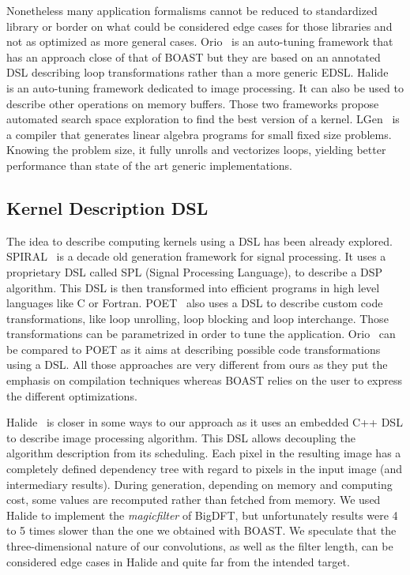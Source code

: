 \documentclass{IEEEtran}
\begin{document}
Nonetheless many application formalisms cannot be reduced to standardized
library or border on what could be considered edge cases for those libraries and
not as optimized as more general cases. Orio~\cite{Hart2009:Orio} is an
auto-tuning framework that has an approach close of that of BOAST but they are
based on an annotated DSL describing loop transformations rather than a more
generic EDSL. Halide~\cite{ragan2013halide} is an auto-tuning framework
dedicated to image processing. It can also be used to describe other
operations on memory buffers. Those two frameworks propose automated search
space exploration to find the best version of a kernel.
LGen~\cite{spampinato2014basic} is a compiler that generates linear algebra
programs for small fixed size problems. Knowing the problem size, it fully
unrolls and vectorizes loops, yielding better performance than state of the
art generic implementations.

\subsection{Kernel Description DSL}

The idea to describe computing kernels using a DSL has been already explored.
SPIRAL~\cite{puschel2004spiral} is a decade old generation
framework for signal processing. It uses a proprietary DSL called SPL (Signal
Processing Language), to describe a DSP algorithm. This DSL is then transformed
into efficient programs in high level languages like C or Fortran.
POET~\cite{yi2007poet} also uses a DSL to describe custom code transformations,
like loop unrolling, loop blocking and loop interchange. Those transformations
can be parametrized in order to tune the application. Orio~\cite{Hart2009:Orio}
can be compared to POET as it aims at describing possible code transformations
using a DSL. All those approaches are very different from ours as they put the
emphasis on compilation techniques whereas BOAST relies on the user to express
the different optimizations.

  Halide~\cite{ragan2013halide} is closer in some ways to our approach as it
uses an embedded C++ DSL to describe image processing algorithm. This DSL allows
decoupling the algorithm description from its scheduling. Each pixel in the
resulting image has a completely defined dependency tree with regard to pixels
in the input image (and intermediary results). During generation, depending on
memory and computing cost, some values are recomputed rather than fetched from
memory. We used Halide to implement the \emph{magicfilter} of BigDFT, but
unfortunately results were 4 to 5 times slower than the one we obtained with
BOAST. We speculate that the three-dimensional nature of our convolutions, as
well as the filter length, can be considered edge cases in Halide and quite far
from the intended target.
\end{document}
